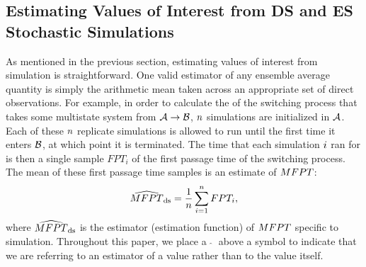 
\subsection{Estimating Values of Interest from DS and ES Stochastic Simulations}
As mentioned in the previous section, estimating values of interest from  simulation is straightforward. One valid estimator of any ensemble average quantity is simply the arithmetic mean taken across an appropriate set of direct observations. For example, in order to calculate the  of the switching process that takes some multistate system from $\mathcal{A} \rightarrow \mathcal{B}$, $n$  simulations are initialized in $\mathcal{A}$. Each of these $n$ replicate simulations is allowed to run until the first time it enters $\mathcal{B}$, at which point it is terminated. The time that each simulation $i$ ran for is then a single sample $FPT_i$ of the first passage time of the switching process. The mean of these first passage time samples is an estimate of $MFPT$\supercite{Gillespie:1981fo}:
    \begin{equation}
        \widehat{MFPT}_{\text{ds}} = \frac{1}{n} \sum^{n}_{i=1} FPT_i,
    \end{equation}
where $\widehat{MFPT}_{\text{ds}}$ is the estimator (\ie estimation function) of $MFPT$ specific to  simulation. Throughout this paper, we place a $\;\widehat{}\;$ above a symbol to indicate that we are referring to an estimator of a value rather than to the value itself.

